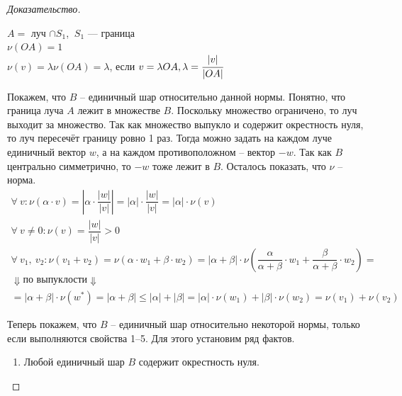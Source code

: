 \documentclass[12pt]{article}
\theoremstyle{definition}
\numberwithin{equation}{section}
\begin{document}
\begin{proof}[Доказательство]
\begin{enumerate}
\begin{center}
				$A = $ луч $ \cap S_1$, $~S_1$ --- граница\\
				$\nu(OA) = 1$\\
				$\nu(v) = \lambda \nu(OA) = \lambda$, если $v = \lambda OA, \lambda = \cfrac{|v|}{|OA|}$
			\end{center}
			Покажем, что $B$ -- единичный шар относительно данной нормы. Понятно, что граница луча $A$ лежит в множестве $B$. Поскольку множество ограничено, то луч выходит за множество. Так как множество выпукло и содержит окрестность нуля, то луч пересечёт границу ровно 1 раз. Тогда можно задать на каждом луче единичный вектор $w$, а на каждом противоположном -- вектор $-w$. Так как $B$ центрально симметрично, то $-w$ тоже лежит в $B$. Осталось показать, что $\nu$ -- норма.
			\begin{gather*}
				\forall\ v : \nu(\alpha \cdot v) = \left|\alpha \cdot \dfrac{|w|}{|v|}\right| = |\alpha| \cdot \dfrac{|w|}{|v|} = |\alpha| \cdot \nu(v)\\
				\forall\ v \neq 0 : \nu(v) = \dfrac{|w|}{|v|} > 0\\
				\forall\ v_1,\ v_2 : \nu(v_1 + v_2) = \nu (\alpha \cdot w_1 + \beta \cdot w_2) = |\alpha + \beta| \cdot \nu\left(\dfrac{\alpha}{\alpha + \beta} \cdot w_1 + \dfrac{\beta}{\alpha + \beta} \cdot w_2\right)= \\
				\Downarrow \text{по выпуклости} \Downarrow\\
				= |\alpha + \beta| \cdot \nu (w^*) = |\alpha + \beta| \leqslant |\alpha| + |\beta| = |\alpha| \cdot \nu(w_1) + |\beta| \cdot \nu(w_2) = \nu(v_1) + \nu(v_2)
			\end{gather*}
		\end{enumerate}
		Теперь покажем, что $B$ -- единичный шар относительно некоторой нормы, только если выполняются свойства 1--5. Для этого установим ряд фактов.
		\begin{enumerate}
			\item Любой единичный шар $B$ содержит окрестность нуля.
				

\end{enumerate}
\end{proof}
\end{document}
